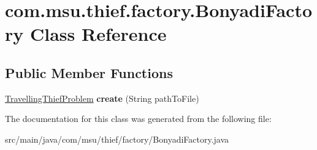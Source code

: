 \hypertarget{classcom_1_1msu_1_1thief_1_1factory_1_1BonyadiFactory}{\section{com.\-msu.\-thief.\-factory.\-Bonyadi\-Factory Class Reference}
\label{classcom_1_1msu_1_1thief_1_1factory_1_1BonyadiFactory}
}
\subsection*{Public Member Functions}
\begin{DoxyCompactItemize}
\item 
\hypertarget{classcom_1_1msu_1_1thief_1_1factory_1_1BonyadiFactory_aba39f47d8b90379dfddc7b9877674ba1}{\hyperlink{classcom_1_1msu_1_1thief_1_1problems_1_1TravellingThiefProblem}{Travelling\-Thief\-Problem} {\bfseries create} (String path\-To\-File)}\label{classcom_1_1msu_1_1thief_1_1factory_1_1BonyadiFactory_aba39f47d8b90379dfddc7b9877674ba1}

\end{DoxyCompactItemize}


The documentation for this class was generated from the following file\-:\begin{DoxyCompactItemize}
\item 
src/main/java/com/msu/thief/factory/Bonyadi\-Factory.\-java\end{DoxyCompactItemize}
